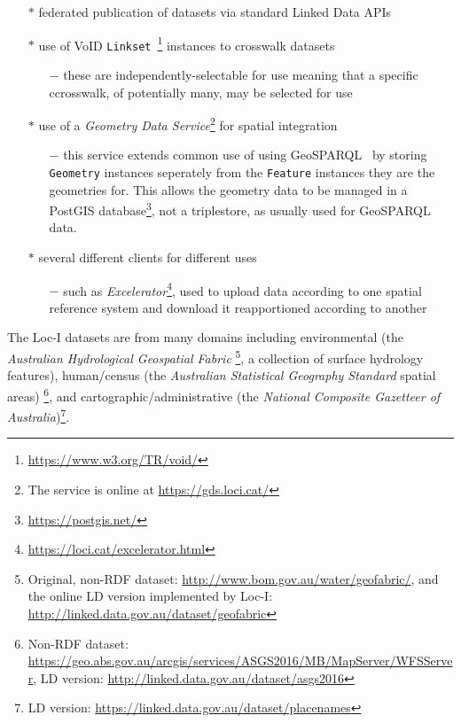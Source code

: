 \documentclass[runningheads]{llncs}
\begin{document}
\begin{itemize}
    \item[$\ast$] federated publication of datasets via standard Linked Data APIs
    \item[$\ast$] use of VoID \texttt{Linkset}~\footnote{\url{https://www.w3.org/TR/void/}} instances to crosswalk datasets
    \begin{itemize}
        \item[$-$] these are independently-selectable for use meaning that a specific ccrosswalk, of potentially many, may be selected for use
    \end{itemize} 
    \item[$\ast$] use of a \textit{Geometry Data Service}\footnote{The service is online at \url{https://gds.loci.cat/}} for spatial integration
    \begin{itemize}
        \item[$-$] this service extends common use of using GeoSPARQL~\cite{open2012ogc} by storing \texttt{Geometry} instances seperately from the \texttt{Feature} instances they are the geometries for. This allows the geometry data to be managed in a PostGIS database\footnote{\url{https://postgis.net/}}, not a triplestore, as usually used for GeoSPARQL data.
    \end{itemize}
    \item[$\ast$] several different clients for different uses
    \begin{itemize}
        \item[$-$] such as \textit{Excelerator}\footnote{\url{https://loci.cat/excelerator.html}}, used to upload data according to one spatial reference system and download it reapportioned according to another
    \end{itemize}
\end{itemize} 

The Loc-I datasets are from many domains including environmental (the \textit{Australian Hydrological Geospatial Fabric}
\footnote{Original, non-RDF dataset: \url{http://www.bom.gov.au/water/geofabric/}, and the online LD version implemented by Loc-I: \url{http://linked.data.gov.au/dataset/geofabric}}, 
a collection of surface hydrology features), human/census (the \textit{Australian Statistical Geography Standard} spatial areas)
\footnote{Non-RDF dataset: \url{https://geo.abs.gov.au/arcgis/services/ASGS2016/MB/MapServer/WFSServer}, LD version: \url{http://linked.data.gov.au/dataset/asgs2016}}, 
and cartographic/administrative (the \textit{National Composite Gazetteer of Australia})\footnote{LD version: \url{https://linked.data.gov.au/dataset/placenames}}. 
\end{document}
